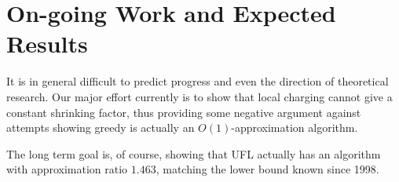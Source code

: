\documentclass{article}[11pt]
\begin{document}
\section{On-going Work and Expected Results}
It is in general difficult to predict progress and even the direction
of theoretical research. Our major effort currently is to show that
local charging cannot give a constant shrinking factor, thus providing
some negative argument against attempts showing greedy is actually an
$O(1)$-approximation algorithm.

The long term goal is, of course, showing that UFL actually has an
algorithm with approximation ratio $1.463$, matching the lower bound
known since 1998.
\end{document}
